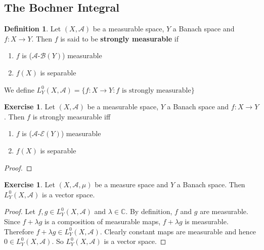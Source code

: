 \documentclass[12pt]{amsart}
\theoremstyle{definition}
\newtheorem{defn}[definition]{Definition}
\newtheorem{ex}[definition]{Exercise}
\newcommand{\lam}{\lambda}
\newcommand{\C}{\mathbb{C}}
\newcommand{\MA}{\mathcal{A}}
\newcommand{\MB}{\mathcal{B}}
\newcommand{\ME}{\mathcal{E}}
\newcommand{\lex}[1]{\label{ex:#1}}
\begin{document}
	
	
	
	
	
	
	
	
	
	
	
	
	
	
	
	
	
	
	
	
	
	
	
	
	\newpage
	\subsection{The Bochner Integral}
	
	\begin{defn}
		Let $(X, \MA)$ be a measurable space, $Y$ a Banach space and $f:X \rightarrow Y$. Then $f$ is said to be \textbf{strongly measurable} if 
		\begin{enumerate}
			\item $f$ is ($\MA$-$\MB(Y)$) measurable
			\item $f(X)$ is separable
		\end{enumerate}
		We define $L^0_Y(X, \MA) = \{f:X \rightarrow Y: f \text{ is strongly measurable}\}$
	\end{defn}

	\begin{ex}
		Let $(X, \MA)$ be a measurable space, $Y$ a Banach space and $f:X \rightarrow Y$. Then $f$ is strongly measurable iff 
		\begin{enumerate}
			\item $f$ is ($\MA$-$\ME(Y)$) measurable
			\item $f(X)$ is separable
		\end{enumerate}
	\end{ex}

	\begin{proof}
		
	\end{proof}


	
	\begin{ex} \lex{00000} 
	Let $(X, \MA, \mu)$ be a measure space and $Y$ a Banach space. Then $L_Y^0(X, \MA)$ is a vector space.
	\end{ex}
	
	\begin{proof}
	Let $f, g \in L_Y^0(X, \MA)$ and $\lam \in \C$. By definition, $f$ and $g$ are measurable. Since $f+\lam g $ is a composition of measurable maps, $f + \lam g$ is measurable. Therefore $f + \lam g \in L_Y^0(X, \MA)$. Clearly constant maps are measurable and hence $0 \in L_Y^0(X, \MA)$. So $L_Y^0(X, \MA)$ is a vector space. 
	\end{proof}
\end{document}
